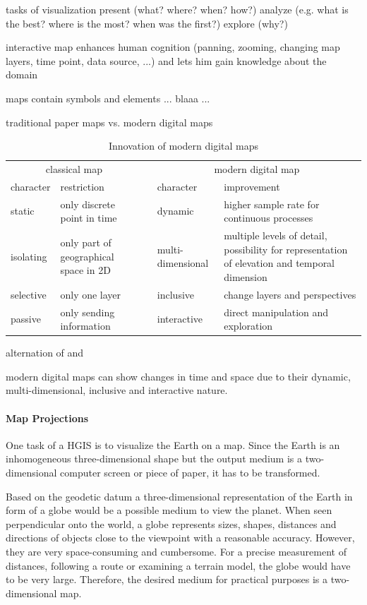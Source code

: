 tasks of visualization
  present (what? where? when? how?)
  analyze (e.g. what is the best? where is the most? when was the first?)
  explore (why?)

interactive map enhances human cognition (panning, zooming, changing map layers, time point, data source, ...) and lets him gain knowledge about the domain

maps contain symbols and elements
  ... blaaa ...

traditional paper maps vs. modern digital maps
\begin{table}[ht]
\centering
\begin{tabular}{llp{1em}ll}
    \toprule
    \multicolumn{2}{c}{classical map} & & \multicolumn{2}{c}{modern digital map} \\
    character & restriction & & character & improvement \\
    \midrule
    static & only discrete point in time & & dynamic & higher sample rate for continuous processes \\
    isolating & only part of geographical space in 2D & & multi-dimensional & multiple levels of detail, possibility for representation of elevation and temporal dimension \\
    selective & only one layer & & inclusive & change layers and perspectives \\
    passive & only sending information & & interactive & direct manipulation and exploration \\
    \bottomrule
\end{tabular}
\caption{Innovation of modern digital maps}
\small{alternation of \cite{karcher} and \cite[p. 145]{ott2001time}}
\label{tab:maps_restrictions}
\end{table}

modern digital maps can show changes in time and space due to their dynamic, multi-dimensional, inclusive and interactive nature.


\paragraph{Map Projections} %
\label{par:map_projections}

One task of a HGIS is to visualize the Earth on a map. Since the Earth is an inhomogeneous three-dimensional shape but the output medium is a two-dimensional computer screen or piece of paper, it has to be transformed.

Based on the geodetic datum a three-dimensional representation of the Earth in form of a globe would be a possible medium to view the planet. When seen perpendicular onto the world, a globe represents sizes, shapes, distances and directions of objects close to the viewpoint with a reasonable accuracy. However, they are very space-consuming and cumbersome. For a precise measurement of distances, following a route or examining a terrain model, the globe would have to be very large. Therefore, the desired medium for practical purposes is a two-dimensional map.


